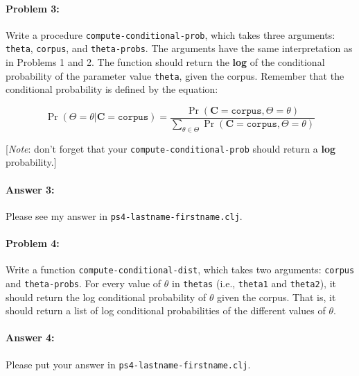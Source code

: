 \documentclass[10pt]{article}
\newcommand{\PSnum}{4}
\begin{document}
\noindent\hrulefill %

\paragraph{Problem 3:}

Write a procedure \texttt{compute-conditional-prob}, which takes three
arguments: \texttt{theta}, \texttt{corpus}, and
\texttt{theta-probs}. The arguments have the same interpretation as in
Problems 1 and 2. The function should return the \textbf{log} of the
conditional probability of the parameter value \texttt{theta}, given the
corpus. Remember that the conditional probability is defined by the
equation:

\begin{equation}
  \Pr(\Theta=\theta|\mathbf{C}=\texttt{corpus}) = \frac{\Pr(\mathbf{C}=\texttt{corpus},\Theta=\theta)}{\sum_{\theta \in \Theta} \Pr(\mathbf{C}=\texttt{corpus}, \Theta=\theta)}
\end{equation}

[\emph{Note}: don't forget that your \texttt{compute-conditional-prob} should return a \textbf{log} probability.]
\paragraph{Answer 3:} Please see my answer in \texttt{ps\PSnum-lastname-firstname.clj}.

\noindent\hrulefill %

\paragraph{Problem 4:}

Write a function \texttt{compute-conditional-dist}, which takes two
arguments: \texttt{corpus} and \texttt{theta-probs}. For every value
of $\theta$ in \texttt{thetas} (i.e., \texttt{theta1} and
\texttt{theta2}), it should return the log conditional probability of
$\theta$ given the corpus. That is, it should return a list of log
conditional probabilities of the different values of $\theta$.

\paragraph{Answer 4:} Please put your answer in
\texttt{ps\PSnum-lastname-firstname.clj}.

\noindent\hrulefill %
\end{document}
